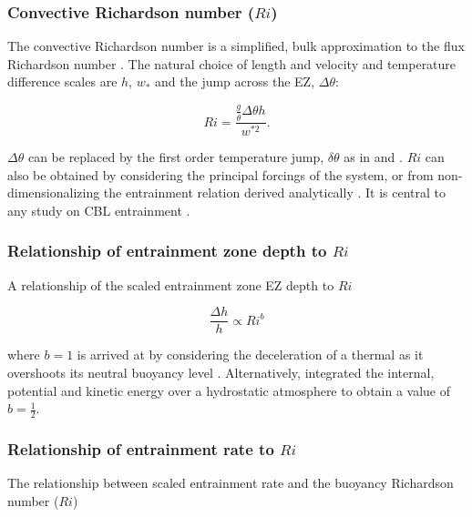 \documentclass[referee]{svjour3}
\begin{document}
\subsubsection{Convective Richardson number ($Ri$)}
\label{subsubsec:}


The convective Richardson number is a simplified, bulk approximation to the flux Richardson number \citep{Stull-BLMetIntro}.  The natural choice of length and velocity and temperature difference scales are $h$, $w_{*}$ and the jump across the EZ, $\Delta \theta$:

\begin{equation}
Ri = \frac{\frac{g}{\overline{\theta}} \Delta \theta h}{w^{*2}}.
\end{equation}

$\Delta \theta$ can be replaced by the first order temperature jump, $\delta \theta$ as in \cite{FedConzMir04} and \cite{GarciaMellado}.  $Ri$ can also be obtained by considering the principal forcings of the system, or from non-dimensionalizing the entrainment relation derived analytically \citep{Tennekes73, Deardorff72}. It is central to any study on CBL entrainment \citep{SullMoengStev, FedConzMir04, Traum11, BrooksFowler2}.

\subsubsection{Relationship of entrainment zone depth to $Ri$}

A relationship of the scaled entrainment zone EZ depth to $Ri$

\begin{equation}\label{eq:dhvsri}
\frac{\Delta h}{h} \propto Ri ^{b}
\end{equation}

where $b=1$ is arrived at by considering the deceleration of a thermal
as it overshoots its neutral buoyancy level \cite{StullNelEl}.  Alternatively, \cite{Boers89} integrated the internal, potential and kinetic energy over a hydrostatic atmosphere to obtain a value of $b=\frac{1}{2}$.

\subsubsection{Relationship of entrainment rate to $Ri$}
\label{subsec:erri}
The relationship between scaled entrainment rate and the buoyancy Richardson number ($Ri$)
\end{document}
